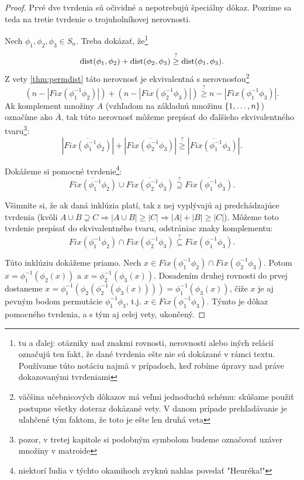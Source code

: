 \begin{proof}
Prvé dve tvrdenia sú očividné a nepotrebujú špeciálny dôkaz.
Pozrime sa teda na tretie tvrdenie o trojuholníkovej nerovnosti.

Nech $\phi_1, \phi_2, \phi_3 \in S_n$. 
Treba dokázať, že\footnote{tu a ďalej: otázniky nad znakmi rovnosti, nerovnosti alebo iných relácií označujú ten fakt, že dané tvrdenia ešte nie sú dokázané v rámci textu. 
Používame túto notáciu najmä v prípadoch, keď robíme úpravy nad práve dokazovanými tvrdeniami} 
$${\rm dist}(\phi_1, \phi_2) + {\rm dist}(\phi_2, \phi_3) \overset{?}{\geq} {\rm dist}(\phi_1, \phi_3).$$
Z vety \ref{thm:permdist} táto nerovnosť je ekvivalentná s nerovnosťou\footnote{väčšina učebnicových dôkazov má veľmi jednoduchú schému: skúšame použiť postupne všetky doteraz dokázané vety. 
V danom prípade prehľadávanie je uľahčené tým faktom, že toto je ešte len druhá veta}
$$(n - |Fix(\phi_1^{-1}\phi_2)|) + (n - |Fix(\phi_2^{-1}\phi_3)|) \overset{?}{\geq} n - |Fix(\phi_1^{-1}\phi_3)|.$$
Ak komplement množiny $A$ (vzhľadom na základnú množinu $\left\{1, \ldots, n\right\}$) označíme ako $\overline{A}$, tak túto nerovnosť môžeme prepísať do ďalšieho ekvivalentného tvaru\footnote{pozor, v tretej kapitole si podobným symbolom budeme označovať uzáver množiny v matroide}:
$$|\overline{Fix(\phi_1^{-1}\phi_2)}| + |\overline{Fix(\phi_2^{-1}\phi_3)}| \overset{?}{\geq} |\overline{Fix(\phi_1^{-1}\phi_3)}|.$$

Dokážeme si pomocné tvrdenie\footnote{niektorí ľudia v týchto okamihoch zvyknú nahlas povedať "Heuréka!"}: 
$$\overline{Fix(\phi_1^{-1}\phi_2)} \cup \overline{Fix(\phi_2^{-1}\phi_3)} \overset{?}{\supseteq} \overline{Fix(\phi_1^{-1}\phi_3)}.$$

Všimnite si, že ak daná inklúzia platí, tak z nej vyplývajú aj predchádzajúce tvrdenia (kvôli $A \cup B \supseteq C \Longrightarrow |A \cup B| \geq |C| \Longrightarrow |A| + |B| \geq |C|$).
Môžeme toto tvrdenie prepísať do ekvivalentného tvaru, odstrániac znaky komplementu:
$$Fix(\phi_1^{-1}\phi_2) \cap Fix(\phi_2^{-1}\phi_3) \overset{?}{\subseteq} Fix(\phi_1^{-1}\phi_3).$$

Túto inklúziu dokážeme priamo. 
Nech $x \in Fix(\phi_1^{-1}\phi_2) \cap Fix(\phi_2^{-1}\phi_3)$. 
Potom $x = \phi_1^{-1}(\phi_2(x))$ a $x = \phi_2^{-1}(\phi_3(x))$.
Dosadením druhej rovnosti do prvej dostaneme $x = \phi_1^{-1}(\phi_2(\phi_2^{-1}(\phi_3(x)))) = \phi_1^{-1}(\phi_3(x))$, čiže $x$ je aj pevným bodom permutácie $\phi_1^{-1} \phi_3$, t.j. $x \in Fix(\phi_1^{-1}\phi_3)$.
Týmto je dôkaz pomocného tvrdenia, a s tým aj celej vety, ukončený.
\end{proof}

